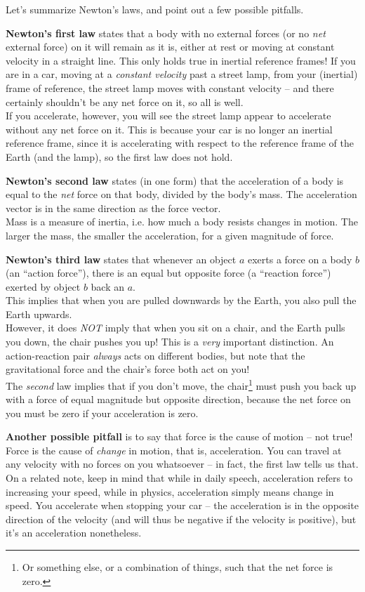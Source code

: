 Let's summarize Newton's laws, and point out a few possible pitfalls.

\textbf{Newton's first law} states that a body with no external forces (or no \emph{net} external force) on it will remain as it is, either at rest or moving at constant velocity in a straight line. This only holds true in inertial reference frames! If you are in a car, moving at a \emph{constant velocity} past a street lamp, from your (inertial) frame of reference, the street lamp moves with constant velocity -- and there certainly shouldn't be any net force on it, so all is well.\\
If you accelerate, however, you will see the street lamp appear to accelerate without any net force on it. This is because your car is no longer an inertial reference frame, since it is accelerating with respect to the reference frame of the Earth (and the lamp), so the first law does not hold.

\textbf{Newton's second law} states (in one form) that the acceleration of a body is equal to the \emph{net} force on that body, divided by the body's mass. The acceleration vector is in the same direction as the force vector.\\
Mass is a measure of inertia, i.e. how much a body resists changes in motion. The larger the mass, the smaller the acceleration, for a given magnitude of force.

\textbf{Newton's third law} states that whenever an object $a$ exerts a force on a body $b$ (an ``action force''), there is an equal but opposite force (a ``reaction force'') exerted by object $b$ back an $a$.\\
This implies that when you are pulled downwards by the Earth, you also pull the Earth upwards.\\
However, it does \emph{NOT} imply that when you sit on a chair, and the Earth pulls you down, the chair pushes you up! This is a \emph{very} important distinction. An action-reaction pair \emph{always} acts on different bodies, but note that the gravitational force and the chair's force both act on you!\\
The \emph{second} law implies that if you don't move, the chair\footnote{Or something else, or a combination of things, such that the net force is zero.} must push you back up with a force of equal magnitude but opposite direction, because the net force on you must be zero if your acceleration is zero.

\textbf{Another possible pitfall} is to say that force is the cause of motion -- not true! Force is the cause of \emph{change} in motion, that is, acceleration. You can travel at any velocity with no forces on you whatsoever -- in fact, the first law tells us that.\\
On a related note, keep in mind that while in daily speech, acceleration refers to increasing your speed, while in physics, acceleration simply means change in speed. You accelerate when stopping your car -- the acceleration is in the opposite direction of the velocity (and will thus be negative if the velocity is positive), but it's an acceleration nonetheless.

